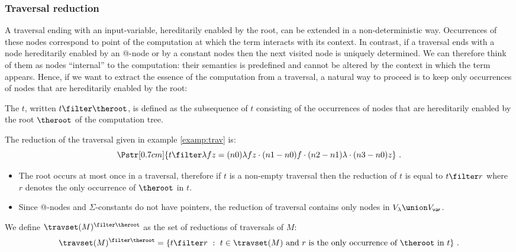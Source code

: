 \subsubsection{Traversal reduction}


A traversal ending with an input-variable, \ie hereditarily enabled by the root, can be extended in a non-deterministic way. Occurrences of these nodes correspond to point of the computation at which the term interacts with its context. In contrast, if a traversal ends with a node hereditarily enabled by an @-node or by a constant nodes then the next visited node is uniquely determined. We can therefore think of them as nodes ``internal'' to the computation: their semantics is predefined and cannot be altered by the context in which the term appears. Hence, if we want to extract the essence of the computation from a traversal, a natural way to proceed is to keep only occurrences of nodes that are hereditarily enabled by the root:
\begin{definition}
The  $t$, written $t\filter \theroot$, is defined as the subsequence of $t$ consisting of the occurrences of nodes that are hereditarily enabled by the root $\theroot$ of the computation tree.
\end{definition}

\begin{example}
The reduction of the traversal given in example \ref{examp:trav} is:
$$ \Pstr[0.7cm]{t \filter \lambda f z = (n0){\lambda f z} \cdot (n1-n0){f}\cdot (n2-n1){\lambda }\cdot (n3-n0){z} } \ .$$
\end{example}


\begin{remark}\hfill
  \begin{itemize}
    \item The root occurs at most once in a traversal, therefore if $t$ is a non-empty traversal then the reduction of $t$ is equal to $t\filter r$ where $r$ denotes the only occurrence of $\theroot$ in $t$.
    \item Since @-nodes and $\Sigma$-constants do not have pointers, the reduction of traversal contains only nodes in $V_\lambda \union V_{\sf var}$.
\end{itemize}
\end{remark}

We define $\travset(M)^{\filter \theroot}$ as the set of reductions of traversals of $M$:
$$\travset(M)^{\filter \theroot} = \{ t \filter r\ :\  t  \in \travset(M) \hbox{ and $r$ is the only occurrence of $\theroot$ in $t$}\} \ . $$


